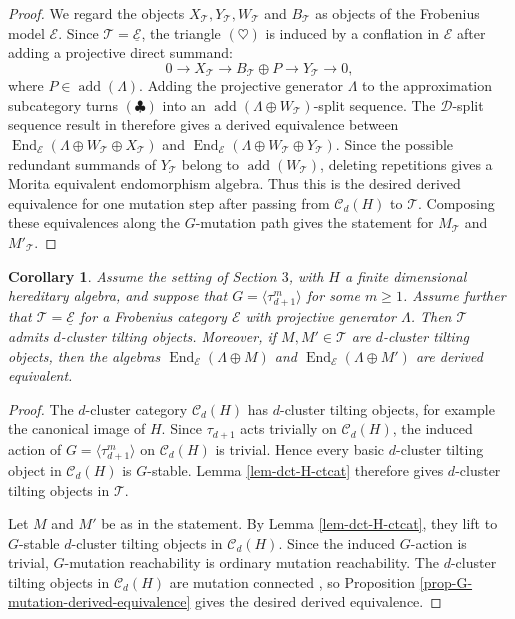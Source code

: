 \documentclass[12pt]{article}
\theoremstyle{plain}
\newtheorem{Coro}[Def]{Corollary}
\theoremstyle{definition}
\DeclareMathOperator{\add}{add}
\DeclareMathOperator{\End}{End}
\newcommand{\T}{\mathcal{T}}
\renewcommand{\geq}{\geqslant}
\begin{document}
\begin{proof}
We regard the objects \(X_{\mathcal T},Y_{\mathcal T},W_{\mathcal T}\) and
\(B_{\mathcal T}\) as objects of the Frobenius model \(\mathcal E\).  Since
\(\mathcal T=\underline{\mathcal E}\), the triangle \((\heartsuit)\) is
induced by a conflation in \(\mathcal E\) after adding a projective direct
summand:
\[
0\longrightarrow X_{\mathcal T}
\longrightarrow B_{\mathcal T}\oplus P
\longrightarrow Y_{\mathcal T}
\longrightarrow 0,
\tag{\(\clubsuit\)}
\]
where \(P\in\add(\Lambda)\).  Adding the projective generator \(\Lambda\) to the
approximation subcategory turns \((\clubsuit)\) into an
\(\add(\Lambda\oplus W_{\mathcal T})\)-split sequence.  The
\(\mathcal D\)-split sequence result in \cite[Theorem 1.1]{Hu2011aa}
therefore gives a derived equivalence between
\(\End_{\mathcal E}(\Lambda\oplus W_{\mathcal T}\oplus X_{\mathcal T})\)
and
\(\End_{\mathcal E}(\Lambda\oplus W_{\mathcal T}\oplus Y_{\mathcal T})\).
Since the possible redundant summands of \(Y_{\mathcal T}\) belong to
\(\add(W_{\mathcal T})\), deleting repetitions gives a Morita equivalent
endomorphism algebra.  Thus this is the desired derived equivalence for one
mutation step after passing from \(\mathcal C_d(H)\) to \(\mathcal T\).
Composing these
equivalences along the \(G\)-mutation path gives the statement for
\(M_{\mathcal T}\) and \(M'_{\mathcal T}\).
\end{proof}

\begin{Coro}\label{coro-taud-power-derived-equivalence}
Assume the setting of Section \(3\), with \(H\) a finite dimensional
hereditary algebra, and suppose that
\(G=\langle \tau_{d+1}^m\rangle\)
for some \(m\geq1\).  Assume further that
\(\mathcal T=\underline{\mathcal E}\) for a Frobenius category \(\mathcal E\)
with projective generator \(\Lambda\).  Then \(\mathcal T\) admits
\(d\)-cluster tilting objects.  Moreover, if \(M,M'\in\T\) are \(d\)-cluster tilting objects, then the algebras $\End_{\mathcal E}(\Lambda\oplus M)$ and $\End_{\mathcal E}(\Lambda\oplus M')$ 
are derived equivalent.
\end{Coro}

\begin{proof}
The \(d\)-cluster category \(\mathcal C_d(H)\) has \(d\)-cluster tilting
objects, for example the canonical image of \(H\).  Since \(\tau_{d+1}\) acts
trivially on \(\mathcal C_d(H)\), the induced action of
\(G=\langle \tau_{d+1}^m\rangle\) on \(\mathcal C_d(H)\) is trivial.  Hence
every basic \(d\)-cluster tilting object in \(\mathcal C_d(H)\) is
\(G\)-stable.  Lemma \ref{lem-dct-H-ctcat} therefore gives
\(d\)-cluster tilting objects in \(\mathcal T\).

Let \(M\) and \(M'\) be as in the statement.  By Lemma
\ref{lem-dct-H-ctcat}, they lift to \(G\)-stable
\(d\)-cluster tilting objects in \(\mathcal C_d(H)\).  Since the induced
\(G\)-action is trivial, \(G\)-mutation reachability is ordinary mutation
reachability.  The \(d\)-cluster tilting objects in \(\mathcal C_d(H)\) are
mutation connected \cite{Zhou2009}, so Proposition
\ref{prop-G-mutation-derived-equivalence} gives the desired derived
equivalence.
\end{proof}
\end{document}

